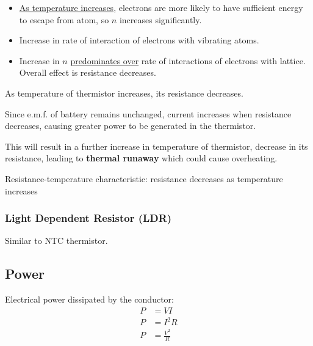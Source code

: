 \begin{itemize}
\item \underline{As temperature increases}, electrons are more likely to have sufficient energy to escape from atom, so $n$ increases significantly.
\item Increase in rate of interaction of electrons with vibrating atoms.
\item Increase in $n$ \underline{predominates over} rate of interactions of electrons with lattice. Overall effect is resistance decreases.
\end{itemize}

\begin{remark}
As temperature of thermistor increases, its resistance decreases.

Since e.m.f. of battery remains unchanged, current increases when resistance decreases, causing greater power to be generated in the thermistor.

This will result in a further increase in temperature of thermistor, decrease in its resistance, leading to \textbf{thermal runaway} which could cause overheating.
\end{remark}

Resistance-temperature characteristic: resistance decreases as temperature increases

\begin{figure}[H]
\centering
{}
\end{figure}

\subsubsection{Light Dependent Resistor (LDR)}
Similar to NTC thermistor.
\pagebreak

\subsection{Power}
Electrical power dissipated by the conductor:
\begin{equation}
\begin{split}
P &= VI \\
P &= I^2R \\
P &= \frac{V^2}{R}
\end{split}
\end{equation}

